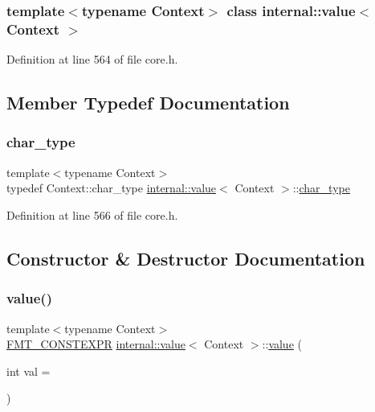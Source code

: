 \subsubsection*{template$<$typename Context$>$\newline
class internal\+::value$<$ Context $>$}



Definition at line 564 of file core.\+h.



\subsection{Member Typedef Documentation}
\mbox{\label{classinternal_1_1value_aea7e71c59ab9961b645ed79e69aff80e}} 
\subsubsection{\texorpdfstring{char\+\_\+type}{char\_type}}
{\footnotesize\ttfamily template$<$typename Context$>$ \\
typedef Context\+::char\+\_\+type \hyperlink{classinternal_1_1value}{internal\+::value}$<$ Context $>$\+::\hyperlink{classinternal_1_1value_aea7e71c59ab9961b645ed79e69aff80e}{char\+\_\+type}}



Definition at line 566 of file core.\+h.



\subsection{Constructor \& Destructor Documentation}
\mbox{\label{classinternal_1_1value_a59a76211dd5b2b104ea8bb58d81a975d}} 
\subsubsection{\texorpdfstring{value()}{value()}\hspace{0.1cm}{\footnotesize\ttfamily [1/12]}}
{\footnotesize\ttfamily template$<$typename Context$>$ \\
\hyperlink{core_8h_a69201cb276383873487bf68b4ef8b4cd}{F\+M\+T\+\_\+\+C\+O\+N\+S\+T\+E\+X\+PR} \hyperlink{classinternal_1_1value}{internal\+::value}$<$ Context $>$\+::\hyperlink{classinternal_1_1value}{value} (\begin{DoxyParamCaption}\item[{int}]{val = {} }\end{DoxyParamCaption})\hspace{0.3cm}{\ttfamily [inline]}}



